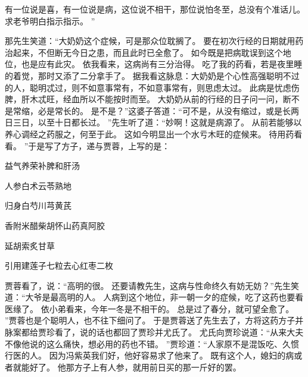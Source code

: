 有一位说是喜，有一位说是病，这位说不相干，那位说怕冬至，总没有个准话儿。
求老爷明白指示指示。
”\par
那先生笑道：“大奶奶这个症候，可是那众位耽搁了。
要在初次行经的日期就用药治起来，不但断无今日之患，而且此时已全愈了。
如今既是把病耽误到这个地位，也是应有此灾。
依我看来，这病尚有三分治得。
吃了我的药看，若是夜里睡的着觉，那时又添了二分拿手了。
据我看这脉息：大奶奶是个心性高强聪明不过的人，聪明忒过，则不如意事常有，不如意事常有，则思虑太过。
此病是忧虑伤脾，肝木忒旺，经血所以不能按时而至。
大奶奶从前的行经的日子问一问，断不是常缩，必是常长的。
是不是？”这婆子答道：“可不是，从没有缩过，或是长两日三日，以至十日都长过。
”先生听了道：“妙啊！这就是病源了。
从前若能够以养心调经之药服之，何至于此。
这如今明显出一个水亏木旺的症候来。
待用药看看。
”于是写了方子，递与贾蓉，上写的是：\par
\hop
益气养荣补脾和肝汤\par
人参\quad 白术\quad 云苓\quad 熟地\par
归身\quad 白芍\quad 川芎\quad 黄芪\par
香附米\quad 醋柴胡\quad 怀山药\quad 真阿胶\par
延胡索\quad 炙甘草\par
引用建莲子七粒去心\quad 红枣二枚\par
{}\par
\hop
贾蓉看了，说：“高明的很。
还要请教先生，这病与性命终久有妨无妨？”先生笑道：“大爷是最高明的人。
人病到这个地位，非一朝一夕的症候，吃了这药也要看医缘了。
依小弟看来，今年一冬是不相干的。
总是过了春分，就可望全愈了。
”贾蓉也是个聪明人，也不往下细问了。
于是贾蓉送了先生去了，方将这药方子并脉案都给贾珍看了，说的话也都回了贾珍并尤氏了。
尤氏向贾珍说道：“从来大夫不像他说的这么痛快，想必用的药也不错。
”贾珍道：“人家原不是混饭吃、久惯行医的人。
因为冯紫英我们好，他好容易求了他来了。
既有这个人，媳妇的病或者就能好了。
他那方子上有人参，就用前日买的那一斤好的罢。
